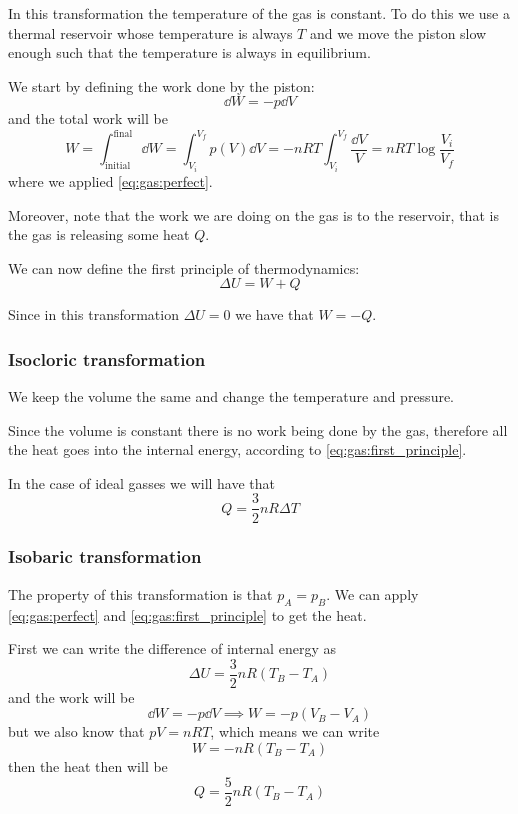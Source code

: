 \documentclass[12pt]{extarticle}
\begin{document}
In this transformation the temperature of the gas is constant.
To do this we use a thermal reservoir whose temperature is always $T$ and we move the piston slow enough such that the temperature is always in equilibrium.

We start by defining the work done by the piston:
\begin{equation}
    \dd{W} = - p \dd{V}
\end{equation}
and the total work will be
\begin{equation}
    W = \int_\text{initial}^\text{final} \dd{W} = \int_{V_i}^{V_f} p(V) \dd{V} = -nRT \int_{V_i}^{V_f} \frac{\dd{V}}{V} = n R T \log \frac{V_i}{V_f}
\end{equation}
where we applied \autoref{eq:gas:perfect}.

Moreover, note that the work we are doing on the gas is  to the reservoir, that is the gas is releasing some heat $Q$.

We can now define the first principle of thermodynamics:
\begin{equation}
    \label{eq:gas:first_principle}
    \Delta U = W + Q
\end{equation}

Since in this transformation $\Delta U = 0$ we have that $W = -Q$.

\subsubsection{Isocloric transformation}

We keep the volume the same and change the temperature and pressure.

Since the volume is constant there is no work being done by the gas, therefore all the heat goes into the internal energy, according to \autoref{eq:gas:first_principle}.

In the case of ideal gasses we will have that
\begin{equation}
    Q = \frac{3}{2}nR\Delta T
\end{equation}

\subsubsection{Isobaric transformation}

The property of this transformation is that $p_A = p_B$. We can apply \autoref{eq:gas:perfect} and \autoref{eq:gas:first_principle} to get the heat.

First we can write the difference of internal energy as
\begin{equation}
    \Delta U = \frac{3}{2}n R (T_B -T_A)
\end{equation}
and the work will be
\begin{equation}
    \dd{W} = -p \dd{V} \implies W = -p (V_B - V_A)
\end{equation}
but we also know that $pV = nRT$, which means we can write
\begin{equation}
    W = -nR (T_B - T_A)
\end{equation}
then the heat then will be
\begin{equation}
    Q = \frac{5}{2}nR(T_B - T_A)
\end{equation}
\end{document}
